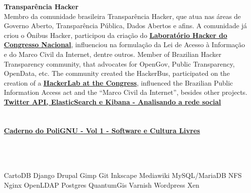 \documentclass[]{friggeri-cv}
\begin{document}
\textbf{Transparência Hacker }\\
%
{Membro da comunidade brasileira Transparência Hacker, que atua nas áreas de Governo Aberto, Transparência Pública, Dados Abertos e afins. A comunidade já criou o Ônibus Hacker, participou da criação do \href{http://blog.openingparliament.org/post/72099651071/a-permanent-hacker-space-in-the-brazilian-congress}{\textbf{Laboratório Hacker do Congresso Nacional}}, influenciou na formulação da Lei de Acesso à Informação e do Marco Civil da Internet, dentre outros.}%
{Member of Brazilian Hacker Transparency community, that advocates for OpenGov, Public Transparency, OpenData, etc. The community created the HackerBus, participated on the creation of a \href{http://blog.openingparliament.org/post/72099651071/a-permanent-hacker-space-in-the-brazilian-congress}{\textbf{HackerLab at the Congress}}, influenced the Brazilian Public Information Access act and the ``Marco Civil da Internet'', besides other projects.}
%
%
{\href{http://polignu.org/artigo/twitter-api-elasticsearch-e-kibana-analisando-rede-social}{\textbf{Twitter API, ElasticSearch e Kibana - Analisando a rede social}}\\
\emph{}\\}\\
\href{http://polignu.org/administrativo/caderno-polignu-volume-1-software-e-culturas-livres}{\textbf{Caderno do PoliGNU - Vol 1 - Software e Cultura Livres}}\\
\emph{}
%
%
\newpage
{}%
%
%
\begin{aside}
~
~
~
  \section{}
    CartoDB
    Django
    Drupal
    Gimp
  	Git
    Inkscape
    Mediawiki
    MySQL/MariaDB
    NFS
    Nginx
    OpenLDAP
    Postgres
    QuantumGis
    Varnish
    Wordpress
    Xen
\end{aside}
\end{document}
